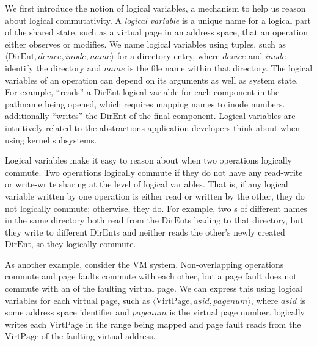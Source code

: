 We first introduce the notion of logical variables, a mechanism to help us
reason about logical commutativity.  A \textit{logical variable} is a unique
name for a logical part of the shared state, such as a virtual page in an
address space, that an operation either observes or modifies.  We name logical
variables using tuples, such as $\langle \mathrm{DirEnt}, \mathit{device},
\mathit{inode}, \mathit{name} \rangle$ for a directory entry, where
$\mathit{device}$ and $\mathit{inode}$ identify the directory and
$\mathit{name}$ is the file name within that directory.  The logical variables
of an operation can depend on its arguments as well as system state.  For
example,  ``reads'' a $\mathrm{DirEnt}$ logical variable for each
component in the pathname being opened, which requires mapping names to inode
numbers.   additionally ``writes'' the $\mathrm{DirEnt}$ of the
final component. Logical variables are intuitively related to the abstractions
application developers think about when using kernel subsystems.

Logical variables make it easy to reason about when two operations logically
commute.  Two operations logically commute if they do not have any read-write
or write-write sharing at the level of logical variables.  That is, if
any logical variable written by one operation is either read or
written by the other, they do not logically commute; otherwise, they
do.
For example, two s of different names in the same directory
both read from the $\mathrm{DirEnt}$s leading to that directory, but
they write to different $\mathrm{DirEnt}$s and neither reads the
other's newly created $\mathrm{DirEnt}$, so they logically commute.

As another example, consider the VM system.  Non-overlapping
 operations commute and page faults commute with each
other, but a page fault does not commute with an  of the
faulting virtual page. We can
express this using logical variables for each virtual page, such as
$\langle \mathrm{VirtPage}, \mathit{asid}, \mathit{pagenum}\rangle$,
where $\mathit{asid}$ is some address space identifier and
$\mathit{pagenum}$ is the virtual page number.   logically
writes each $\mathrm{VirtPage}$ in the range being mapped and page
fault reads from the $\mathrm{VirtPage}$ of the faulting virtual
address.

